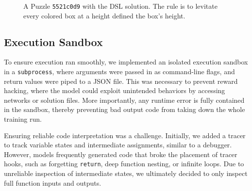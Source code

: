 \documentclass{article}
\begin{document}
\begin{figure}[t]
  \caption{A Puzzle \texttt{5521c0d9} with the DSL solution. The rule is to levitate every colored box at a height defined the box's height.}
  \label{fig:dsl}
\end{figure}


\subsection{Execution Sandbox}

To ensure execution ran smoothly, we implemented an isolated execution sandbox in a \texttt{subprocess}, where arguments were passed in as command-line flags, and return values were piped to a JSON file. This was necessary to prevent reward hacking, where the model could exploit unintended behaviors by accessing networks or solution files. More importantly, any runtime error is fully contained in the sandbox, thereby preventing bad output code from taking down the whole training run.

Ensuring reliable code interpretation was a challenge. Initially, we added a tracer to track variable states and intermediate assignments, similar to a debugger. However, models frequently generated code that broke the placement of tracer hooks, such as forgetting \texttt{return}, deep function nesting, or infinite loops. Due to unreliable inspection of intermediate states, we ultimately decided to only inspect full function inputs and outputs.
\end{document}
